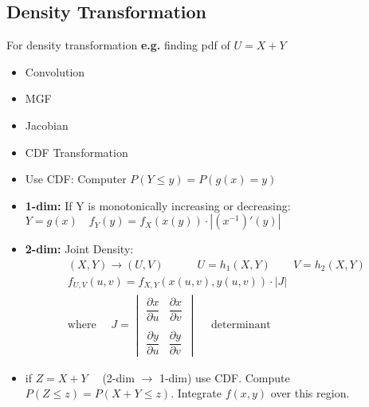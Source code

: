 \subsection*{Density Transformation}
For density transformation \textbf{e.g.} finding pdf of $U = X + Y$
\begin{multicols}{2}
	\begin{itemize}[label={--}]
	\item Convolution
	\item MGF
	\item Jacobian
	\item CDF Transformation
\end{itemize}
\end{multicols}
\begin{itemize}
	\item Use CDF: Computer $P(Y \leq y) = P(g(x) = y)$
	\item \textbf{1-dim: } If Y is monotonically increasing or decreasing: $Y = g(x) \quad \boxed{f_Y(y) = f_X(x(y)) \cdot |(x^{-1})'(y)|}$
	\item \textbf{2-dim: } Joint Density:
	\begin{gather*}
		(X, Y) \rightarrow (U, V) \quad \quad \quad U = h_1(X, Y) \quad \quad V = h_2(X,Y)\\
		f_{U,V}(u,v) = f_{X,Y}(x(u,v), y(u,v)) \cdot |J|\\
		\text{where } \quad J = \begin{vmatrix}
			\dfrac{\partial x}{\partial u} & \dfrac{\partial x}{\partial v}\\\\
			\dfrac{\partial y}{\partial u} & \dfrac{\partial y}{\partial v}
		\end{vmatrix} \quad \text{ determinant}
	\end{gather*}
	\item if $Z = X + Y\quad$ (2-dim $\rightarrow$ 1-dim) use CDF. Compute $P(Z \leq z) = P(X+Y \leq z)$. Integrate $f(x,y)$ over this region.
\end{itemize}
